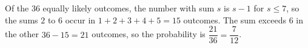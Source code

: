 Of the $36$ equally likely outcomes, the number with sum $s$ is $s-1$ for $s\le7$, so the sums $2$ to $6$ occur in $1+2+3+4+5=15$ outcomes. The sum exceeds $6$ in the other $36-15=21$ outcomes, so the probability is $\dfrac{21}{36}=\boxed{\dfrac{7}{12}}$.
